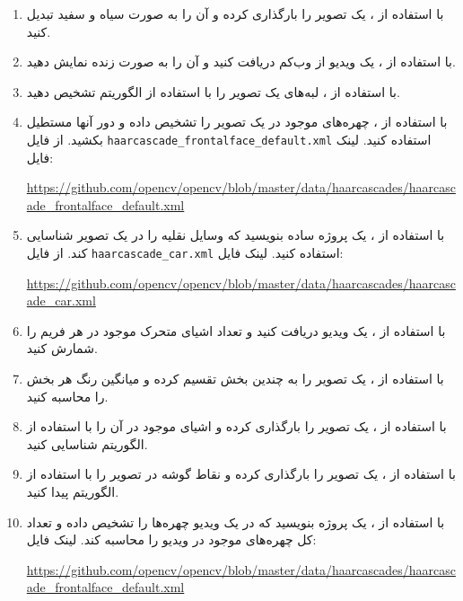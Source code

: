 \documentclass[a4paper,12pt]{article}
\begin{document}
	\begin{enumerate}
		\item با استفاده از ، یک تصویر را بارگذاری کرده و آن را به صورت سیاه و سفید تبدیل کنید.
		\item با استفاده از ، یک ویدیو از وب‌کم دریافت کنید و آن را به صورت زنده نمایش دهید.
		\item با استفاده از ، لبه‌های یک تصویر را با استفاده از الگوریتم  تشخیص دهید.
		\item با استفاده از ، چهره‌های موجود در یک تصویر را تشخیص داده و دور آنها مستطیل بکشید. از فایل \texttt{haarcascade\_frontalface\_default.xml} استفاده کنید.  
		لینک فایل:  
		\begin{flushleft}
			\url{https://github.com/opencv/opencv/blob/master/data/haarcascades/haarcascade_frontalface_default.xml}
		\end{flushleft}
		\item با استفاده از ، یک پروژه ساده بنویسید که وسایل نقلیه را در یک تصویر شناسایی کند. از فایل \texttt{haarcascade\_car.xml} استفاده کنید.  
		لینک فایل:  
		\begin{flushleft}
			\url{https://github.com/opencv/opencv/blob/master/data/haarcascades/haarcascade_car.xml}
		\end{flushleft}
		\item با استفاده از ، یک ویدیو دریافت کنید و تعداد اشیای متحرک موجود در هر فریم را شمارش کنید.
		\item با استفاده از ، یک تصویر را به چندین بخش تقسیم کرده و میانگین رنگ هر بخش را محاسبه کنید.
		\item با استفاده از ، یک تصویر را بارگذاری کرده و اشیای موجود در آن را با استفاده از الگوریتم  شناسایی کنید.
		\item با استفاده از ، یک تصویر را بارگذاری کرده و نقاط گوشه در تصویر را با استفاده از الگوریتم  پیدا کنید.
		\item با استفاده از ، یک پروژه بنویسید که در یک ویدیو چهره‌ها را تشخیص داده و تعداد کل چهره‌های موجود در ویدیو را محاسبه کند.  
		لینک فایل:  
		\begin{flushleft}
			\url{https://github.com/opencv/opencv/blob/master/data/haarcascades/haarcascade_frontalface_default.xml}
		\end{flushleft}
	\end{enumerate}
	
	
	
\end{document}
